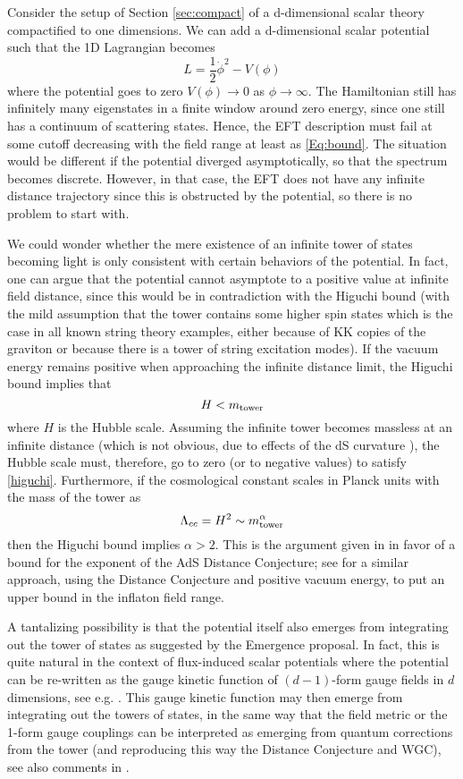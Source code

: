\documentclass[11pt]{article}
\numberwithin{equation}{section}
\newcommand{\beq}{\begin{equation}}  \newcommand{\eeq}{\end{equation}}
\numberwithin{equation}{section}
\theoremstyle{remark}
\begin{document}
Consider the setup of Section \ref{sec:compact} of a d-dimensional scalar theory compactified to one dimensions. We can add a d-dimensional scalar potential such that the 1D Lagrangian becomes
\beq
L=\frac12 \dot{\phi}^2-V(\phi)
\eeq
where the potential goes to zero $V(\phi)\rightarrow 0$ as $\phi\rightarrow \infty$. The Hamiltonian still has infinitely many eigenstates in a finite window around zero energy, since one still has a continuum of scattering states. Hence, the EFT description must fail at some cutoff decreasing with the field range at least as \eqref{Eq:bound}. The situation would be different if the potential diverged asymptotically, so that the spectrum becomes discrete. However, in that case, the EFT does not have any infinite distance trajectory since this is obstructed by the potential, so there is no problem to start with.

We could wonder whether the mere existence of an infinite tower of states becoming light is only consistent with certain behaviors of the potential. In fact, one can argue that the potential cannot asymptote to a positive value at infinite field distance, since this would be in contradiction with the Higuchi bound \cite{Higuchi:1986py} (with the mild assumption that the tower contains some higher spin states which is the case in all known string theory examples, either because of KK copies of the graviton or because there is a tower of string excitation modes). If the vacuum energy remains positive when approaching the infinite distance limit, the Higuchi bound implies that
\beq
\label{higuchi}
H< m_{\rm tower}
\eeq
where $H$ is the Hubble scale. Assuming the infinite tower becomes massless at an infinite distance (which is not obvious, due to effects of the dS curvature \cite{Noumi:2019ohm,Kato:2021rdz}), the Hubble scale must, therefore, go to zero (or to negative values) to satisfy \eqref{higuchi}. Furthermore, if the cosmological constant scales in Planck units with the mass of the tower as
\beq
\label{LM}
\Lambda_{cc} =H^2 \sim m_{\rm tower}^\alpha
\eeq
then the Higuchi bound implies $\alpha>2$. This is the argument given in \cite{Lust:2019zwm} in favor of a bound for the exponent of the AdS Distance Conjecture; see \cite{Scalisi:2019gfv} for a similar approach, using the Distance Conjecture and positive vacuum energy, to put an upper bound in the inflaton field range. 

A tantalizing possibility is that the potential itself also emerges from integrating out the tower of states as suggested by the Emergence proposal. In fact, this is quite natural in the context of flux-induced scalar potentials where the potential can be re-written as the gauge kinetic function of $(d-1)$-form gauge fields in $d$ dimensions, see e.g. \cite{Marchesano:2014mla,Bielleman:2015ina}. This gauge kinetic function may then emerge from integrating out the towers of states, 
in the same way that the field metric or the 1-form gauge couplings can be interpreted as emerging from quantum corrections from the tower \cite{Heidenreich:2017sim,Grimm:2018ohb} (and reproducing this way the Distance Conjecture and WGC), see also comments in \cite{Font:2019cxq}. 
\end{document}
